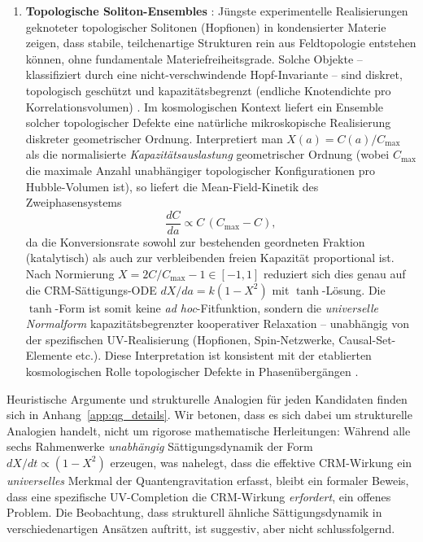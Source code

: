 \documentclass[11pt,a4paper]{article}
\begin{document}
\begin{enumerate}
\item \textbf{Topologische Soliton-Ensembles} \cite{FaddeevNiemi1997,AckermanSmalyukh2017}: J\"ungste experimentelle Realisierungen geknoteter topologischer Solitonen (Hopfionen) in kondensierter Materie \cite{AckermanSmalyukh2017} zeigen, dass stabile, teilchenartige Strukturen rein aus Feldtopologie entstehen k\"onnen, ohne fundamentale Materiefreiheitsgrade. Solche Objekte -- klassifiziert durch eine nicht-verschwindende Hopf-Invariante -- sind diskret, topologisch gesch\"utzt und kapazit\"atsbegrenzt (endliche Knotendichte pro Korrelationsvolumen) \cite{BattyeSutcliffe1998}. Im kosmologischen Kontext liefert ein Ensemble solcher topologischer Defekte eine nat\"urliche mikroskopische Realisierung diskreter geometrischer Ordnung. Interpretiert man $X(a) = C(a)/C_{\max}$ als die normalisierte \textit{Kapazit\"atsauslastung} geometrischer Ordnung (wobei $C_{\max}$ die maximale Anzahl unabh\"angiger topologischer Konfigurationen pro Hubble-Volumen ist), so liefert die Mean-Field-Kinetik des Zweiphasensystems
\begin{equation}
\frac{dC}{da} \propto C\,(C_{\max} - C),
\end{equation}
da die Konversionsrate sowohl zur bestehenden geordneten Fraktion (katalytisch) als auch zur verbleibenden freien Kapazit\"at proportional ist. Nach Normierung $X = 2C/C_{\max} - 1 \in [-1,1]$ reduziert sich dies genau auf die CRM-S\"attigungs-ODE $dX/da = k(1 - X^2)$ mit $\tanh$-L\"osung. Die $\tanh$-Form ist somit keine \textit{ad hoc}-Fitfunktion, sondern die \textit{universelle Normalform} kapazit\"atsbegrenzter kooperativer Relaxation -- unabh\"angig von der spezifischen UV-Realisierung (Hopfionen, Spin-Netzwerke, Causal-Set-Elemente etc.). Diese Interpretation ist konsistent mit der etablierten kosmologischen Rolle topologischer Defekte in Phasen\"uberg\"angen \cite{VilenkinShellard1994}.
\end{enumerate}

Heuristische Argumente und strukturelle Analogien f\"ur jeden Kandidaten finden sich in Anhang~\ref{app:qg_details}. Wir betonen, dass es sich dabei um strukturelle Analogien handelt, nicht um rigorose mathematische Herleitungen: W\"ahrend alle sechs Rahmenwerke \textit{unabh\"angig} S\"attigungsdynamik der Form $dX/dt \propto (1 - X^2)$ erzeugen, was nahelegt, dass die effektive CRM-Wirkung ein \textit{universelles} Merkmal der Quantengravitation erfasst, bleibt ein formaler Beweis, dass eine spezifische UV-Completion die CRM-Wirkung \textit{erfordert}, ein offenes Problem. Die Beobachtung, dass strukturell \"ahnliche S\"attigungsdynamik in verschiedenartigen Ans\"atzen auftritt, ist suggestiv, aber nicht schlussfolgernd.
\end{document}
